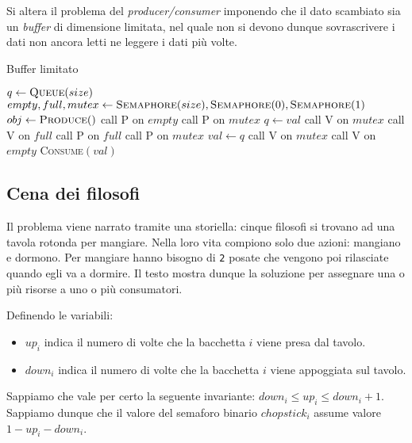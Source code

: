 \documentclass{article}
\begin{document}
Si altera il problema del \emph{producer/consumer} imponendo che il dato
scambiato sia un \emph{buffer} di dimensione limitata, nel quale non si devono
dunque sovrascrivere i dati non ancora letti ne leggere i dati pi\`u volte.

\begin{algorithm}[H]
  \caption{Buffer limitato}
  \begin{algorithmic}[0]
    \State $q \gets \textsc{Queue}(size)$
    \State $empty, full, mutex \gets \textsc{Semaphore}(size), \textsc{Semaphore}(0), \textsc{Semaphore}(1)$
    \State
        \State $obj \gets \textsc{Produce}()$
        \State call \textsc{P} on $empty$
        \State call \textsc{P} on $mutex$
        \State $q \gets val$
        \State call \textsc{V} on $mutex$
        \State call \textsc{V} on $full$
      \EndWhile
    \EndProcedure
    \State
        \State call \textsc{P} on $full$
        \State call \textsc{P} on $mutex$
        \State $val \gets q$
        \State call \textsc{V} on $mutex$
        \State call \textsc{V} on $empty$
        \State \textsc{Consume}$(val)$
      \EndWhile
    \EndProcedure
  \end{algorithmic}
\end{algorithm}

\subsection{Cena dei filosofi}

Il problema viene narrato tramite una storiella: cinque filosofi si trovano ad
una tavola rotonda per mangiare. Nella loro vita compiono solo due azioni:
mangiano e dormono. Per mangiare hanno bisogno di \texttt{2} posate che vengono
poi rilasciate quando egli va a dormire. Il testo mostra dunque la soluzione per
assegnare una o pi\`u risorse a uno o pi\`u consumatori.

Definendo le variabili:

\begin{itemize}
  \item $up_i$ indica il numero di volte che la bacchetta $i$ viene presa dal tavolo.
  \item $down_i$ indica il numero di volte che la bacchetta $i$ viene appoggiata sul tavolo.
\end{itemize}

Sappiamo che vale per certo la seguente invariante: $down_i \leq up_i \leq down_i + 1$.
Sappiamo dunque che il valore del semaforo binario $chopstick_i$ assume valore $1-up_i-down_i$.
\end{document}
